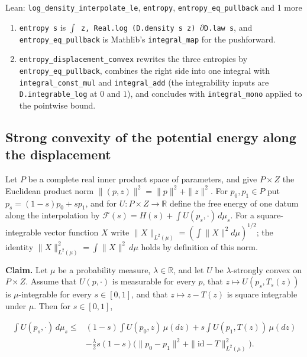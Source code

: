 \documentclass[11pt,a4paper]{report}
\begin{document}
\begin{leanbox}{Lean: \texttt{log\_\allowbreak{}density\_\allowbreak{}interpolate\_\allowbreak{}le}, \texttt{entropy}, \texttt{entropy\_\allowbreak{}eq\_\allowbreak{}pullback} and 1 more}
\begin{enumerate}
\item \texttt{entropy s} is \texttt{\ensuremath{\int} z, Real.\allowbreak{}log (D.\allowbreak{}density s z) \ensuremath{\partial}D.\allowbreak{}law s}, and \texttt{entropy\_\allowbreak{}eq\_\allowbreak{}pullback} is Mathlib's \texttt{integral\_\allowbreak{}map} for the pushforward.

\item \texttt{entropy\_\allowbreak{}displacement\_\allowbreak{}convex} rewrites the three entropies by \texttt{entropy\_\allowbreak{}eq\_\allowbreak{}pullback}, combines the right side into one integral with \texttt{integral\_\allowbreak{}const\_\allowbreak{}mul} and \texttt{integral\_\allowbreak{}add} (the integrability inputs are \texttt{D.\allowbreak{}integrable\_\allowbreak{}log} at \(0\) and \(1\)), and concludes with \texttt{integral\_\allowbreak{}mono} applied to the pointwise bound.

\end{enumerate}
\end{leanbox}
\subsection{\texorpdfstring{Strong convexity of the potential energy along the displacement}{Strong convexity of the potential energy along the displacement}}


Let \(P\) be a complete real inner product space of parameters, and give \(P\times Z\) the Euclidean product norm \(\|(p,z)\|^2=\|p\|^2+\|z\|^2\). For \(p_0,p_1\in P\) put \(p_s=(1-s)p_0+sp_1\), and for \(U:P\times Z\to\mathbb R\) define the free energy of one datum along the interpolation by \(\mathcal F(s)=H(s)+\int U(p_s,\cdot)\,d\mu_s\). For a square-integrable vector function \(X\) write \(\|X\|_{L^2(\mu)}=(\int\|X\|^2d\mu)^{1/2}\); the identity \(\|X\|_{L^2(\mu)}^2=\int\|X\|^2\,d\mu\) holds by definition of this norm.




\textbf{Claim.} Let \(\mu\) be a probability measure, \(\lambda\in\mathbb R\), and let \(U\) be \(\lambda\)-strongly convex on \(P\times Z\). Assume that \(U(p,\cdot)\) is measurable for every \(p\), that \(z\mapsto U(p_s,T_s(z))\) is \(\mu\)-integrable for every \(s\in[0,1]\), and that \(z\mapsto z-T(z)\) is square integrable under \(\mu\). Then for \(s\in[0,1]\),


\[\begin{aligned}\int U(p_s,\cdot)\,d\mu_s\le{}&(1-s)\int U(p_0,z)\,\mu(dz)+s\int U(p_1,T(z))\,\mu(dz)\\&-\frac\lambda2s(1-s)\bigl(\|p_0-p_1\|^2+\|\mathrm{id}-T\|_{L^2(\mu)}^2\bigr).\end{aligned}\]
\end{document}
